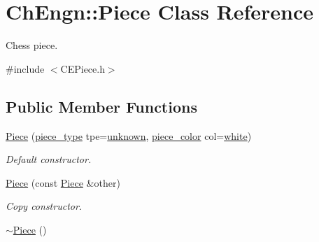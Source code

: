 \hypertarget{classChEngn_1_1Piece}{
\section{ChEngn::Piece Class Reference}
\label{classChEngn_1_1Piece}
}


Chess piece.  




{\ttfamily \#include $<$CEPiece.h$>$}

\subsection*{Public Member Functions}
\begin{DoxyCompactItemize}
\item 
\hyperlink{classChEngn_1_1Piece_a8fab80193d22fc9f4a4645a50fe90dc3}{Piece} (\hyperlink{namespaceChEngn_a2a35c185f259757a78e937575b8ed483}{piece\_\-type} tpe=\hyperlink{namespaceChEngn_a538ef441c024a7e5d4c1dedb5e03fc21}{unknown}, \hyperlink{namespaceChEngn_a9c81426c0134a97288a226c122daf62f}{piece\_\-color} col=\hyperlink{namespaceChEngn_aa3212b290980eb5db7f91e88f8803a9c}{white})
\begin{DoxyCompactList}\small\item\em Default constructor. \item\end{DoxyCompactList}\item 
\hyperlink{classChEngn_1_1Piece_a5abff07a09fc78b6fc805cde2a298b41}{Piece} (const \hyperlink{classChEngn_1_1Piece}{Piece} \&other)
\begin{DoxyCompactList}\small\item\em Copy constructor. \item\end{DoxyCompactList}\item 
\hypertarget{classChEngn_1_1Piece_a75360762004389b1df624136bcaff309}{
\hyperlink{classChEngn_1_1Piece_a75360762004389b1df624136bcaff309}{$\sim$Piece} ()}
\label{classChEngn_1_1Piece_a75360762004389b1df624136bcaff309}


\end{DoxyCompactItemize}
